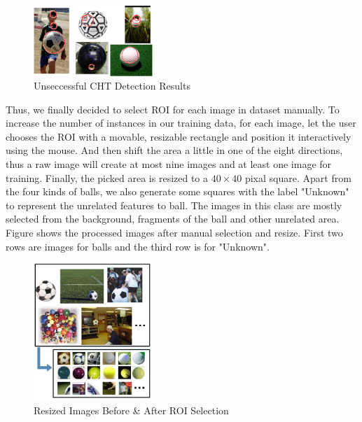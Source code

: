 \documentclass{article}
\begin{document}
\begin{figure}[htp]
\centering
\includegraphics[width=0.4\textwidth]{circleDetection.jpg}
\caption{Unseccessful CHT Detection Results}
\label{fig:cird}
\end{figure}

Thus, we finally decided to select ROI for each image in dataset manually. To increase the number of instances in our training data, for each image, let the user chooses the ROI with a movable, resizable rectangle and position it interactively using the mouse. And then shift the area a little in one of the eight directions, thus a raw image will create at most nine images and at least one image for training. Finally, the picked area is resized to a $40 \times 40$ pixal square. Apart from the four kinds of balls, we also generate some squares with the label "Unknown" to represent the unrelated features to ball. The images in this class are mostly selected from the background, fragments of the ball and other unrelated area. Figure \cite{ROIResult} shows the processed images after manual selection and resize. First two rows are images for balls and the third row is for "Unknown".
\begin{figure}[htp]
\centering
\includegraphics[width=0.4\textwidth]{ROISelection.jpg}
\caption{Resized Images Before \& After ROI Selection}
\label{fig:ROIResult}
\end{figure}

\end{document}
